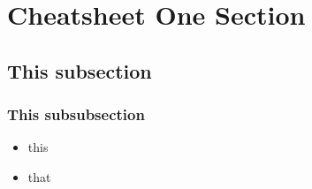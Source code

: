 \section{Cheatsheet One Section}

\subsection{This subsection}

\subsubsection{This subsubsection}

\begin{itemize}
\item this
\item that
\end{itemize}

